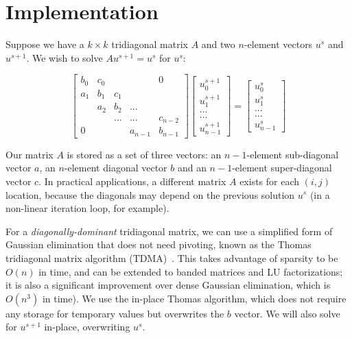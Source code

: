 \documentclass[conference]{IEEEtran}
\begin{document}
\section{Implementation}

Suppose we have a \(k \times k\) tridiagonal matrix $A$ and two $n$-element
vectors $u^{s}$ and $u^{s+1}$.  We wish to solve $Au^{s+1} = u^{s}$ for
$u^{s}$:

\[
\begin{bmatrix}
b_0 & c_0 &     &         & 0       \\
a_1 & b_1 & c_1 &         &         \\
    & a_2 & b_2 & ...     &         \\
    &     & ... & ...     & c_{n-2} \\
0   &     &     & a_{n-1} & b_{n-1}
\end{bmatrix}
\begin{bmatrix}
u^{s+1}_0     \\
u^{s+1}_1     \\
...     \\
...     \\
u^{s+1}_{n-1}
\end{bmatrix}
=
\begin{bmatrix}
u^{s}_0     \\
u^{s}_1     \\
...     \\
...     \\
u^{s}_{n-1}
\end{bmatrix}
\]

Our matrix $A$ is stored as a set of three vectors: an $n-1$-element
sub-diagonal vector $a$, an $n$-element diagonal vector $b$ and an $n-1$-element
super-diagonal vector $c$.
In practical applications, a different matrix $A$ exists for
  each $(i,j)$ location, because the diagonals may depend on the previous 
  solution $u^{s}$ (in a non-linear iteration loop, for example).

For a \emph{diagonally-dominant} tridiagonal matrix,
  we can use a simplified form of Gaussian elimination 
  that does not need pivoting, known as the Thomas 
  tridiagonal matrix algorithm (TDMA)~\cite{TDMA}. 
This takes advantage of sparsity to be \(O(n)\) in time, 
  and can be extended to banded matrices and LU factorizations;
  it is also a significant improvement over dense Gaussian elimination,
  which is \(O(n^3)\) in time). 
We use the in-place Thomas algorithm,
which does not require any storage for temporary values but overwrites the $b$
vector. We will also solve for $u^{s+1}$ in-place, overwriting $u^{s}$.
\end{document}
